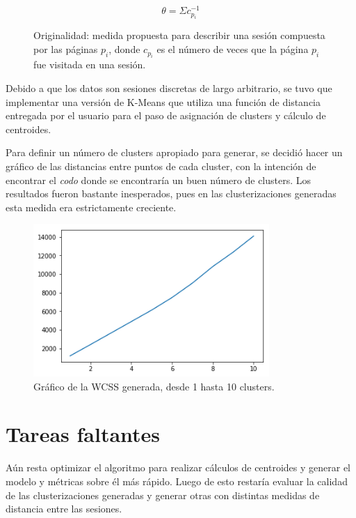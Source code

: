 \documentclass[letterpaper,11pt]{article} %
\begin{document}
	\begin{figure}[H]
		\centering
		\begin{equation*}
			\theta = \Sigma c_{p_i}^{-1}
		\end{equation*}
		\caption{Originalidad: medida propuesta para describir una sesión compuesta por las páginas $p_i$, donde $c_{p_i}$ es el número de veces que la página $p_i$ fue visitada en una sesión.}
	\end{figure}

	Debido a que los datos son sesiones discretas de largo arbitrario, se tuvo que implementar una versión de K-Means que utiliza una función de distancia entregada por el usuario para el paso de asignación de clusters y cálculo de centroides.

	Para definir un número de clusters apropiado para generar, se decidió hacer un gráfico de las distancias entre puntos de cada cluster, con la intención de encontrar el \textit{codo} donde se encontraría un buen número de clusters. Los resultados fueron bastante inesperados, pues en las clusterizaciones generadas esta medida era estrictamente creciente.

	\begin{figure}[H]
		\centering
		\includegraphics[width=0.8\textwidth]{images/WCSS}
		\caption{Gráfico de la WCSS generada, desde 1 hasta 10 clusters.}
	\end{figure}
	
\section{Tareas faltantes}
	Aún resta optimizar el algoritmo para realizar cálculos de centroides y generar el modelo y métricas sobre él más rápido. Luego de esto restaría evaluar la calidad de las clusterizaciones generadas y generar otras con distintas medidas de distancia entre las sesiones.
\end{document}
